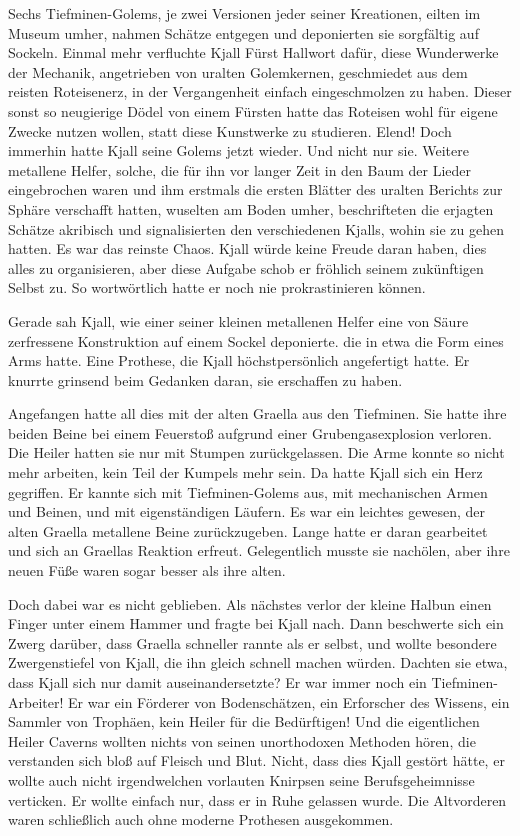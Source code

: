 \documentclass[10pt, a4paper, oneside]{book}
\begin{document}
Sechs Tiefminen-Golems, je zwei Versionen jeder seiner Kreationen, eilten im Museum umher, nahmen Schätze entgegen und deponierten sie sorgfältig auf Sockeln. Einmal mehr verfluchte Kjall Fürst Hallwort dafür, diese Wunderwerke der Mechanik, angetrieben von uralten Golemkernen, geschmiedet aus dem reisten Roteisenerz, in der Vergangenheit einfach eingeschmolzen zu haben. Dieser sonst so neugierige Dödel von einem Fürsten hatte das Roteisen wohl für eigene Zwecke nutzen wollen, statt diese Kunstwerke zu studieren. Elend! Doch immerhin hatte Kjall seine Golems jetzt wieder. Und nicht nur sie. Weitere metallene Helfer, solche, die für ihn vor langer Zeit in den Baum der Lieder eingebrochen waren und ihm erstmals die ersten Blätter des uralten Berichts zur Sphäre verschafft hatten, wuselten am Boden umher, beschrifteten die erjagten Schätze akribisch und signalisierten den verschiedenen Kjalls, wohin sie zu gehen hatten. Es war das reinste Chaos. Kjall würde keine Freude daran haben, dies alles zu organisieren, aber diese Aufgabe schob er fröhlich seinem zukünftigen Selbst zu. So wortwörtlich hatte er noch nie prokrastinieren können.

Gerade sah Kjall, wie einer seiner kleinen metallenen Helfer eine von Säure zerfressene Konstruktion auf einem Sockel deponierte. die in etwa die Form eines Arms hatte. Eine Prothese, die Kjall höchstpersönlich angefertigt hatte. Er knurrte grinsend beim Gedanken daran, sie erschaffen zu haben.

Angefangen hatte all dies mit der alten Graella aus den Tiefminen. Sie hatte ihre beiden Beine bei einem Feuerstoß aufgrund einer Grubengasexplosion verloren. Die Heiler hatten sie nur mit Stumpen zurückgelassen. Die Arme konnte so nicht mehr arbeiten, kein Teil der Kumpels mehr sein. Da hatte Kjall sich ein Herz gegriffen. Er kannte sich mit Tiefminen-Golems aus, mit mechanischen Armen und Beinen, und mit eigenständigen Läufern. Es war ein leichtes gewesen, der alten Graella metallene Beine zurückzugeben. Lange hatte er daran gearbeitet und sich an Graellas Reaktion erfreut. Gelegentlich musste sie nachölen, aber ihre neuen Füße waren sogar besser als ihre alten.

Doch dabei war es nicht geblieben. Als nächstes verlor der kleine Halbun einen Finger unter einem Hammer und fragte bei Kjall nach. Dann beschwerte sich ein Zwerg darüber, dass Graella schneller rannte als er selbst, und wollte besondere Zwergenstiefel von Kjall, die ihn gleich schnell machen würden. Dachten sie etwa, dass Kjall sich nur damit auseinandersetzte? Er war immer noch ein Tiefminen-Arbeiter! Er war ein Förderer von Bodenschätzen, ein Erforscher des Wissens, ein Sammler von Trophäen, kein Heiler für die Bedürftigen! Und die eigentlichen Heiler Caverns wollten nichts von seinen unorthodoxen Methoden hören, die verstanden sich bloß auf Fleisch und Blut. Nicht, dass dies Kjall gestört hätte, er wollte auch nicht irgendwelchen vorlauten Knirpsen seine Berufsgeheimnisse verticken. Er wollte einfach nur, dass er in Ruhe gelassen wurde. Die Altvorderen waren schließlich auch ohne moderne Prothesen ausgekommen.
\end{document}
